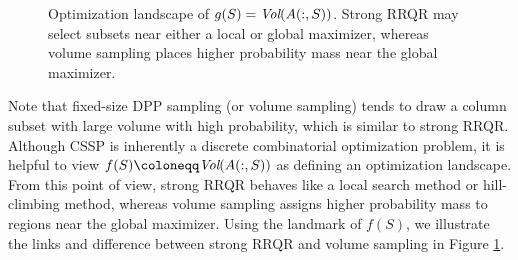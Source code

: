 \documentclass[11pt]{article}
\newcommand{\<}{\langle}
\renewcommand{\>}{\rangle}
\begin{document}
\begin{figure}[H]
\centering
{}

\caption{
Optimization landscape of $g(S)=\emph{Vol}(A(:,S))$.
Strong RRQR may select subsets near either a local or global maximizer,
whereas volume sampling places higher probability mass
near the global maximizer.
}
\label{fig:rrqr_and_volume}
\end{figure}

Note that fixed-size DPP sampling (or volume sampling) tends to draw a column subset with large volume with high probability, which is similar to strong RRQR. Although CSSP is inherently a discrete combinatorial optimization problem, it is helpful to view
$f(S)\coloneqq \emph{Vol}(A(:,S))$ as defining an optimization landscape. From this point of view, strong RRQR behaves like a local search method or hill-climbing method, whereas volume sampling assigns higher probability mass to regions near the global maximizer. Using the landmark of $f(S)$, we illustrate the links and difference between strong RRQR and volume sampling in Figure \ref{fig:rrqr_and_volume}.
\end{document}

